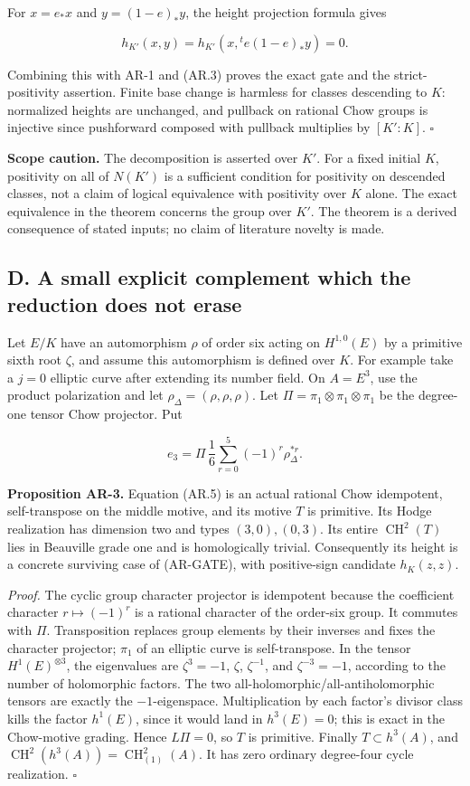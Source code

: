 For \(x=e_*x\) and \(y=(1-e)_*y\), the height projection formula gives

\[
h_{K'}(x,y)=h_{K'}(x,{}^t e(1-e)_*y)=0.
\]

Combining this with AR-1 and (AR.3) proves the exact gate and the
strict-positivity assertion. Finite base change is harmless for classes
descending to \(K\): normalized heights are unchanged, and pullback on
rational Chow groups is injective since pushforward composed with
pullback multiplies by \([K':K]\). \(\square\)

\textbf{Scope caution.} The decomposition is asserted over \(K'\). For a
fixed initial \(K\), positivity on all of \(N(K')\) is a sufficient
condition for positivity on descended classes, not a claim of logical
equivalence with positivity over \(K\) alone. The exact equivalence in
the theorem concerns the group over \(K'\). The theorem is a derived
consequence of stated inputs; no claim of literature novelty is made.

\subsection{D. A small explicit complement which the reduction does not
erase}\label{d.-a-small-explicit-complement-which-the-reduction-does-not-erase}

Let \(E/K\) have an automorphism \(\rho\) of order six acting on
\(H^{1,0}(E)\) by a primitive sixth root \(\zeta\), and assume this
automorphism is defined over \(K\). For example take a \(j=0\) elliptic
curve after extending its number field. On \(A=E^3\), use the product
polarization and let \(\rho_\Delta=(\rho,\rho,\rho)\). Let
\(\Pi=\pi_1\otimes\pi_1\otimes\pi_1\) be the degree-one tensor Chow
projector. Put

\[
e_3=\Pi\,\frac16\sum_{r=0}^5(-1)^r\rho_\Delta^{*r}.
\tag{AR.5}
\]

\textbf{Proposition AR-3.} Equation (AR.5) is an actual rational Chow
idempotent, self-transpose on the middle motive, and its motive \(T\) is
primitive. Its Hodge realization has dimension two and types
\((3,0),(0,3)\). Its entire \(\operatorname{CH}^2(T)\) lies in Beauville
grade one and is homologically trivial. Consequently its height is a
concrete surviving case of (AR-GATE), with positive-sign candidate
\(h_K(z,z)\).

\emph{Proof.} The cyclic group character projector is idempotent because
the coefficient character \(r\mapsto(-1)^r\) is a rational character of
the order-six group. It commutes with \(\Pi\). Transposition replaces
group elements by their inverses and fixes the character projector;
\(\pi_1\) of an elliptic curve is self-transpose. In the tensor
\(H^1(E)^{\otimes3}\), the eigenvalues are \(\zeta^3=-1\), \(\zeta\),
\(\zeta^{-1}\), and \(\zeta^{-3}=-1\), according to the number of
holomorphic factors. The two all-holomorphic/all-antiholomorphic tensors
are exactly the \(-1\)-eigenspace. Multiplication by each factor's
divisor class kills the factor \(h^1(E)\), since it would land in
\(h^3(E)=0\); this is exact in the Chow-motive grading. Hence
\(L\Pi=0\), so \(T\) is primitive. Finally \(T\subset h^3(A)\), and
\(\operatorname{CH}^2(h^3(A))=\operatorname{CH}^2_{(1)}(A)\). It has
zero ordinary degree-four cycle realization. \(\square\)

